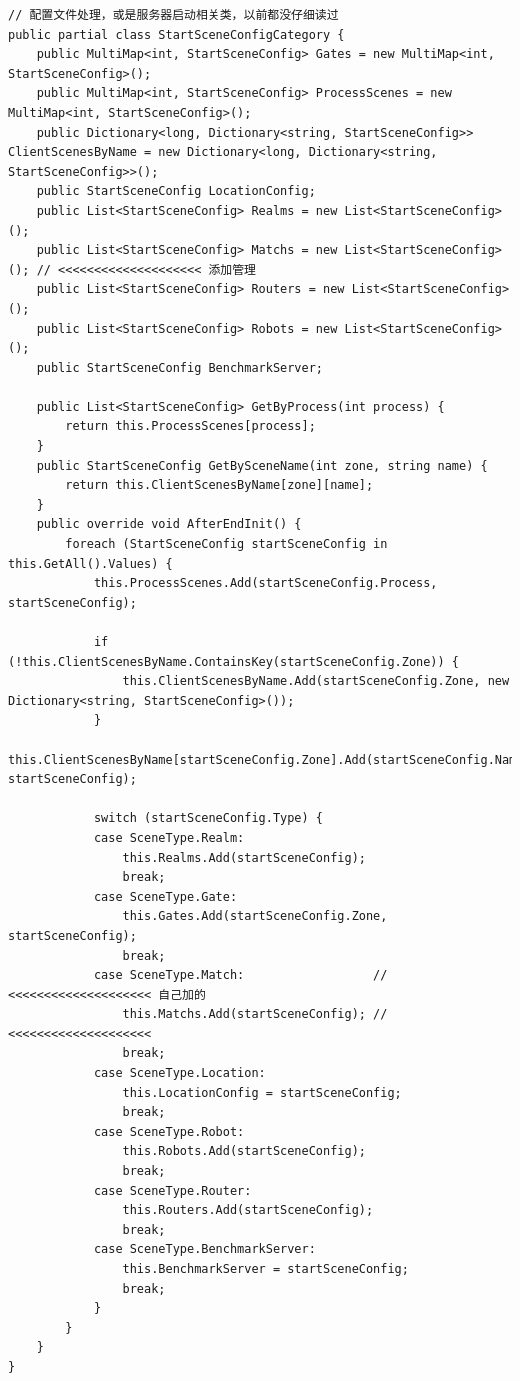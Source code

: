\documentclass[9pt, b5paper]{article}
\begin{document}
\begin{verbatim}
// 配置文件处理，或是服务器启动相关类，以前都没仔细读过
public partial class StartSceneConfigCategory {
    public MultiMap<int, StartSceneConfig> Gates = new MultiMap<int, StartSceneConfig>();
    public MultiMap<int, StartSceneConfig> ProcessScenes = new MultiMap<int, StartSceneConfig>();
    public Dictionary<long, Dictionary<string, StartSceneConfig>> ClientScenesByName = new Dictionary<long, Dictionary<string, StartSceneConfig>>();
    public StartSceneConfig LocationConfig;
    public List<StartSceneConfig> Realms = new List<StartSceneConfig>();
    public List<StartSceneConfig> Matchs = new List<StartSceneConfig>(); // <<<<<<<<<<<<<<<<<<<< 添加管理
    public List<StartSceneConfig> Routers = new List<StartSceneConfig>();
    public List<StartSceneConfig> Robots = new List<StartSceneConfig>();
    public StartSceneConfig BenchmarkServer;

    public List<StartSceneConfig> GetByProcess(int process) {
        return this.ProcessScenes[process];
    }
    public StartSceneConfig GetBySceneName(int zone, string name) {
        return this.ClientScenesByName[zone][name];
    }
    public override void AfterEndInit() {
        foreach (StartSceneConfig startSceneConfig in this.GetAll().Values) {
            this.ProcessScenes.Add(startSceneConfig.Process, startSceneConfig);
                
            if (!this.ClientScenesByName.ContainsKey(startSceneConfig.Zone)) {
                this.ClientScenesByName.Add(startSceneConfig.Zone, new Dictionary<string, StartSceneConfig>());
            }
            this.ClientScenesByName[startSceneConfig.Zone].Add(startSceneConfig.Name, startSceneConfig);
                
            switch (startSceneConfig.Type) {
            case SceneType.Realm:
                this.Realms.Add(startSceneConfig);
                break;
            case SceneType.Gate:
                this.Gates.Add(startSceneConfig.Zone, startSceneConfig);
                break;
            case SceneType.Match:                  // <<<<<<<<<<<<<<<<<<<< 自己加的
                this.Matchs.Add(startSceneConfig); // <<<<<<<<<<<<<<<<<<<< 
                break;
            case SceneType.Location:
                this.LocationConfig = startSceneConfig;
                break;
            case SceneType.Robot:
                this.Robots.Add(startSceneConfig);
                break;
            case SceneType.Router:
                this.Routers.Add(startSceneConfig);
                break;
            case SceneType.BenchmarkServer:
                this.BenchmarkServer = startSceneConfig;
                break;
            }
        }
    }
}
\end{verbatim}
\end{document}
